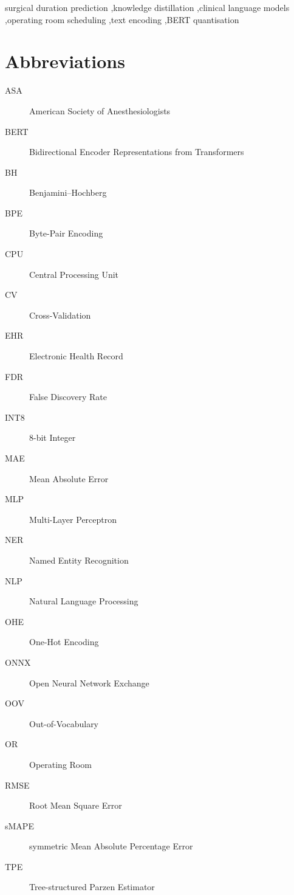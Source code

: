 \documentclass[3p]{elsarticle}
\begin{document}
\begin{frontmatter}

\begin{keyword}
surgical duration prediction \sep knowledge distillation \sep clinical language models \sep operating room scheduling \sep text encoding \sep BERT quantisation
\end{keyword}

\end{frontmatter}

\section*{Abbreviations}
\begin{description}
    \item[ASA] American Society of Anesthesiologists
    \item[BERT] Bidirectional Encoder Representations from Transformers
    \item[BH] Benjamini--Hochberg
    \item[BPE] Byte-Pair Encoding
    \item[CPU] Central Processing Unit
    \item[CV] Cross-Validation
    \item[EHR] Electronic Health Record
    \item[FDR] False Discovery Rate
    \item[INT8] 8-bit Integer
    \item[MAE] Mean Absolute Error
    \item[MLP] Multi-Layer Perceptron
    \item[NER] Named Entity Recognition
    \item[NLP] Natural Language Processing
    \item[OHE] One-Hot Encoding
    \item[ONNX] Open Neural Network Exchange
    \item[OOV] Out-of-Vocabulary
    \item[OR] Operating Room
    \item[RMSE] Root Mean Square Error
    \item[sMAPE] symmetric Mean Absolute Percentage Error
    \item[TPE] Tree-structured Parzen Estimator
\end{description}
\end{document}
